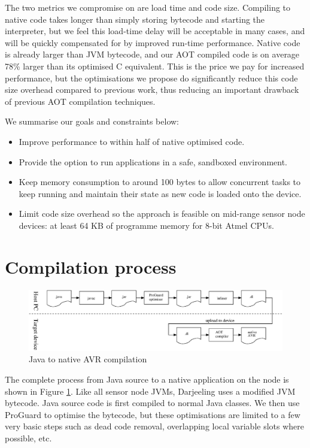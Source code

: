 The two metrics we compromise on are load time and code size. Compiling to native code takes longer than simply storing bytecode and starting the interpreter, but we feel this load-time delay will be acceptable in many cases, and will be quickly compensated for by improved run-time performance. Native code is already larger than JVM bytecode, and our AOT compiled code is on average 78\% larger than its optimised C equivalent. This is the price we pay for increased performance, but the optimisations we propose do significantly reduce this code size overhead compared to previous work, thus reducing an important drawback of previous AOT compilation techniques.

We summarise our goals and constraints below:
\begin{itemize}
  \item Improve performance to within half of native optimised code.
  \item Provide the option to run applications in a safe, sandboxed environment.
  \item Keep memory consumption to around 100 bytes to allow concurrent tasks to keep running and maintain their state as new code is loaded onto the device.
  \item Limit code size overhead so the approach is feasible on mid-range sensor node devices: at least 64 KB of programme memory for 8-bit Atmel CPUs.
\end{itemize}

\section{Compilation process}
\label{sec-compilation-process}

\begin{figure}
\includegraphics[width=\linewidth]{compilation-process.eps}
\caption{Java to native AVR compilation}
\label{fig-translation-process}
\end{figure}

The complete process from Java source to a native application on the node is shown in Figure \ref{fig-translation-process}. Like all sensor node JVMs, Darjeeling uses a modified JVM bytecode. Java source code is first compiled to normal Java classes. We then use ProGuard \cite{proguard} to optimise the bytecode, but these optimisations are limited to a few very basic steps such as dead code removal, overlapping local variable slots where possible, etc.

